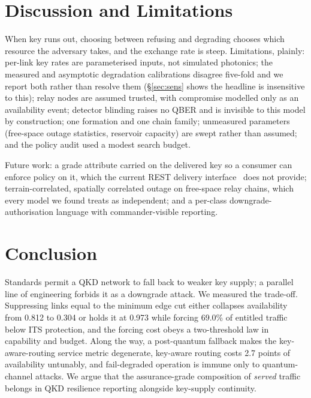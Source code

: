 \documentclass[conference]{IEEEtran}
\begin{document}
\section{Discussion and Limitations}
When key runs out, choosing between refusing and degrading chooses which resource
the adversary takes, and the exchange rate is steep. Limitations, plainly:
per-link key rates are parameterised inputs, not simulated photonics; the
measured and asymptotic degradation calibrations disagree five-fold and we report
both rather than resolve them (\S\ref{sec:sens} shows the headline is insensitive
to this); relay nodes are assumed trusted, with compromise modelled only as an
availability event; detector blinding raises no QBER and is invisible to this
model by construction; one formation and one chain family; unmeasured parameters
(free-space outage statistics, reservoir capacity) are swept rather than assumed;
and the policy audit used a modest search budget.

Future work: a grade attribute carried on the delivered key so a consumer can
enforce policy on it, which the current REST delivery interface~\cite{etsi014}
does not provide; terrain-correlated, spatially correlated outage on
free-space relay chains, which every model we found treats as independent; and a
per-class downgrade-authorisation language with commander-visible reporting.

\section{Conclusion}
Standards permit a QKD network to fall back to weaker key supply; a parallel line
of engineering forbids it as a downgrade attack. We measured the trade-off.
Suppressing links equal to the minimum edge cut either collapses availability
from 0.812 to 0.304 or holds it at 0.973 while forcing 69.0\% of entitled traffic
below ITS protection, and the forcing cost obeys a two-threshold law in
capability and budget. Along the way, a post-quantum fallback makes the
key-aware-routing service metric degenerate, key-aware routing costs 2.7 points
of availability untunably, and fail-degraded operation is immune only to
quantum-channel attacks. We argue that the assurance-grade composition of
\emph{served} traffic belongs in QKD resilience reporting alongside key-supply
continuity.
\end{document}
